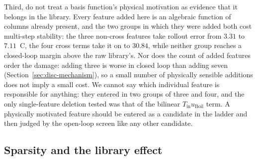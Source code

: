 Third, do not treat a basis function's physical motivation as evidence that it
belongs in the library. Every feature added here is an algebraic function of columns
already present, and the two groups in
which they were added both cost multi-step stability: the three non-cross features
take rollout error from $3.31$ to $7.11$~\textdegree C, the four cross terms take
it on to $30.84$, while neither group reaches a closed-loop margin above the raw
library's. Nor does the count of added features order the damage: adding
three is worse in closed loop than adding seven
(Section~\ref{sec:disc-mechanism}), so a small number of physically sensible
additions does not imply a small cost. We cannot say which individual feature is
responsible for anything: they entered in two groups of three and four, and the only
single-feature deletion tested was that of the bilinear $T_{\text{in}}u_{\text{Boil}}$
term. A physically motivated feature should be entered as a candidate in the ladder
and then judged by the open-loop screen like any other candidate.

\subsection{Sparsity and the library effect}
\label{sec:disc-sparsity}

